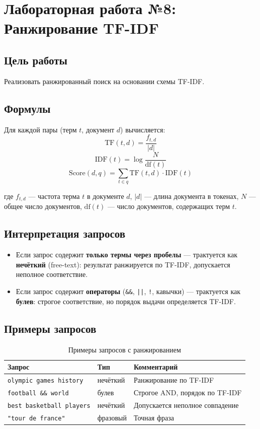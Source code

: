 \documentclass[a4paper,12pt]{article}
\begin{document}
\section{Лабораторная работа №8: Ранжирование TF-IDF}

\subsection{Цель работы}
Реализовать ранжированный поиск на основании схемы TF-IDF.

\subsection{Формулы}
Для каждой пары (терм $t$, документ $d$) вычисляется:
$$\text{TF}(t,d) = \frac{f_{t,d}}{|d|}$$
$$\text{IDF}(t) = \log\frac{N}{\text{df}(t)}$$
$$\text{Score}(d, q) = \sum_{t \in q} \text{TF}(t,d) \cdot \text{IDF}(t)$$

где $f_{t,d}$ --- частота терма $t$ в документе $d$, $|d|$ --- длина документа в токенах, $N$ --- общее число документов, $\text{df}(t)$ --- число документов, содержащих терм $t$.

\subsection{Интерпретация запросов}
\begin{itemize}
    \item Если запрос содержит \textbf{только термы через пробелы} — трактуется как \textbf{нечёткий} (free-text): результат ранжируется по TF-IDF, допускается неполное соответствие.
    \item Если запрос содержит \textbf{операторы} (\texttt{\&\&}, \texttt{||}, \texttt{!}, кавычки) — трактуется как \textbf{булев}: строгое соответствие, но порядок выдачи определяется TF-IDF.
\end{itemize}

\subsection{Примеры запросов}
\begin{table}[H]
\centering
\begin{tabular}{|l|l|l|}
\hline
\textbf{Запрос} & \textbf{Тип} & \textbf{Комментарий} \\
\hline
\texttt{olympic games history} & нечёткий & Ранжирование по TF-IDF \\
\hline
\texttt{football \&\& world} & булев & Строгое AND, порядок по TF-IDF \\
\hline
\texttt{best basketball players} & нечёткий & Допускается неполное совпадение \\
\hline
\texttt{"tour de france"} & фразовый & Точная фраза \\
\hline
\end{tabular}
\caption{Примеры запросов с ранжированием}
\end{table}
\end{document}
